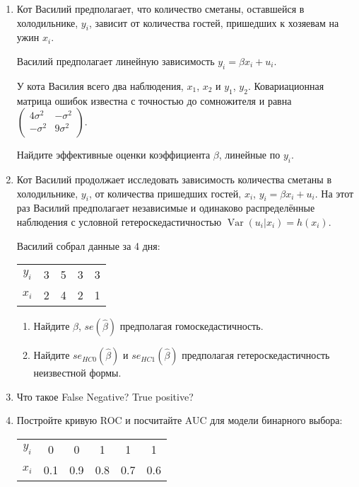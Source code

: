\documentclass[12pt]{article}
\DeclareMathOperator{\Var}{Var}
\def \hb{\hat{\beta}}
\begin{document}

\begin{enumerate}
\item Кот Василий предполагает, что количество
сметаны, оставшейся в холодильнике, $y_i$, зависит от количества гостей, пришедших к хозяевам на ужин $x_i$.

Василий предполагает линейную зависимость $y_i = \beta x_i + u_i$.

У кота Василия всего два наблюдения, $x_1$, $x_2$ и $y_1$, $y_2$. Ковариационная матрица
ошибок известна с точностью до сомножителя и равна $
\begin{pmatrix}
  4\sigma^2 & - \sigma^2 \\
  - \sigma^2 & 9\sigma^2 \\
\end{pmatrix}$.

Найдите эффективные оценки коэффициента $\beta$, линейные по $y_i$.

\item Кот Василий продолжает исследовать зависимость количества сметаны в холодильнике, $y_i$,
от количества пришедших гостей, $x_i$, $y_i = \beta x_i + u_i$.
На этот раз Василий предполагает независимые и
одинаково распределённые наблюдения с условной гетероскедастичностью $\Var(u_i |x_i) = h(x_i)$.

Василий собрал данные за 4 дня:

\begin{tabular}{ccccc}
\toprule
$y_i$ & 3 & 5 & 3 & 3 \\
$x_i$ & 2 & 4 & 2 & 1 \\
\bottomrule
\end{tabular}

\begin{enumerate}
  \item Найдите $\hb$, $se(\hb)$ предполагая гомоскедастичность.
  \item Найдите $se_{HC0}(\hb)$ и $se_{HC1}(\hb)$ предполагая гетероскедастичность неизвестной формы.
\end{enumerate}

\item Что такое False Negative? True positive?
\item Постройте кривую ROC и посчитайте AUC для модели бинарного выбора:

\begin{tabular}{cccccc}
\toprule
$y_i$ & 0 & 0 & 1 & 1 & 1 \\
$x_i$ & 0.1 & 0.9 & 0.8 & 0.7 & 0.6 \\
\bottomrule
\end{tabular}




\end{enumerate}
\end{document}
